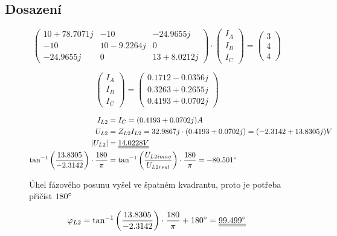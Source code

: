 \subsection{Dosazení}
\begin{figure}[H]

  $$
    \begin{pmatrix}
      10 + 78.7071j & -10         & -24.9655j    \\
      -10           & 10 -9.2264j & 0            \\
      -24.9655j     & 0           & 13 + 8.0212j
    \end{pmatrix}
    \cdot
    \begin{pmatrix}
      I_A \\
      I_B \\
      I_C
    \end{pmatrix}
    =
    \begin{pmatrix}
      3 \\
      4 \\
      4
    \end{pmatrix}
  $$

  $$
    \begin{pmatrix}
      I_A \\
      I_B \\
      I_C
    \end{pmatrix}
    =
    \begin{pmatrix}
      0.1712 - 0.0356j \\
      0.3263 + 0.2655j \\
      0.4193 + 0.0702j
    \end{pmatrix}
  $$

  \begin{equation*}
    \begin{aligned}
      I_{L2}                                                                      & = I_C = (0.4193 + 0.0702j) A                                                                          \\
      U_{L2}                                                                      & = Z_{L2} I_{L2} = 32.9867j \cdot (0.4193 + 0.0702j) = (-2.3142 + 13.8305j) V                          \\
      |U_{L2}|                                                                    & = \underline{\underline{14.0228 V}}                                                                   \\
      \mathrm{tan^{-1}}\left(\frac{13.8305}{-2.3142}\right) \cdot \frac{180}{\pi} & = \mathrm{tan^{-1}}\left(\frac{U_{L2imag}}{U_{L2real}}\right) \cdot \frac{180}{\pi} = -80.501 \degree
    \end{aligned}
  \end{equation*}

  Úhel fázového posunu vyšel ve špatném kvadrantu, proto je potřeba přičíst $180 \degree$

  $$ \varphi_{L2} = \mathrm{tan^{-1}}\left(\frac{13.8305}{-2.3142}\right) \cdot \frac{180}{\pi} + 180 \degree = \underline{\underline{ 99.499 \degree }}$$

\end{figure}
